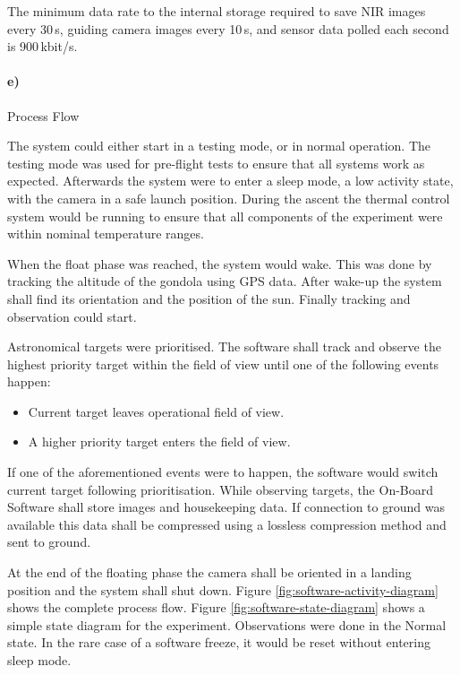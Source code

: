 The minimum data rate to the internal storage required to save NIR images every 30\,s, guiding camera images every 10\,s, and sensor data polled each second is 900\,kbit/s.


\paragraph{e)} Process Flow

The system could either start in a testing mode, or in normal operation. The testing mode was used for pre-flight tests to ensure that all systems work as expected. Afterwards the system were to enter a sleep mode, a low activity state, with the camera in a safe launch position. During the ascent the thermal control system would be running to ensure that all components of the experiment were within nominal temperature ranges.

When the float phase was reached, the system would wake. This was done by tracking the altitude of the gondola using GPS data. After wake-up the system shall find its orientation and the position of the sun. Finally tracking and observation could start.

Astronomical targets were prioritised. The software shall track and observe the highest priority target within the field of view until one of the following events happen:

\begin{itemize}
    \item Current target leaves operational field of view.
    \item A higher priority target enters the field of view.
\end{itemize}

If one of the aforementioned events were to happen, the software would switch current target following prioritisation. While observing targets, the On-Board Software shall store images and housekeeping data. If connection to ground was available this data shall be compressed using a lossless compression method and sent to ground.

At the end of the floating phase the camera shall be oriented in a landing position and the system shall shut down. Figure \ref{fig:software-activity-diagram} shows the complete process flow. Figure \ref{fig:software-state-diagram} shows a simple state diagram for the experiment. Observations were done in the Normal state. In the rare case of a software freeze, it would be reset without entering sleep mode.

